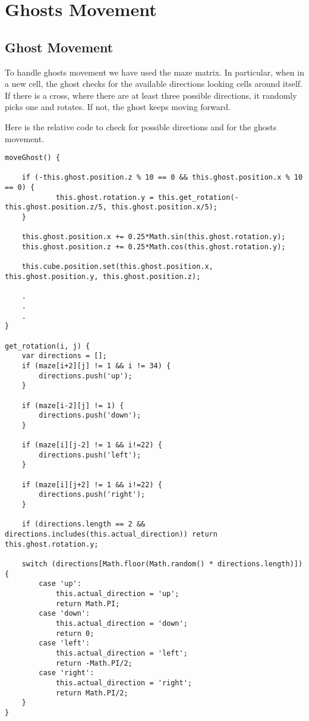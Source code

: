 \documentclass[a4paper,oneside]{report}
\begin{document}
\section{Ghosts Movement}
\subsection{Ghost Movement}
To handle ghosts movement we have used the maze matrix. In particular, when in a new cell, the ghost checks for the available directions looking cells around itself. If there is a cross, where there are at least three possible directions, it randomly picks one and rotates. If not, the ghost keeps moving forward. 

Here is the relative code to check for possible directions and for the ghosts movement.
\begin{lstlisting}
moveGhost() {

    if (-this.ghost.position.z % 10 == 0 && this.ghost.position.x % 10 == 0) {
            this.ghost.rotation.y = this.get_rotation(-this.ghost.position.z/5, this.ghost.position.x/5);
    }

    this.ghost.position.x += 0.25*Math.sin(this.ghost.rotation.y);
    this.ghost.position.z += 0.25*Math.cos(this.ghost.rotation.y);

    this.cube.position.set(this.ghost.position.x, this.ghost.position.y, this.ghost.position.z);
        
    .
    .
    .
}

get_rotation(i, j) {
    var directions = [];
    if (maze[i+2][j] != 1 && i != 34) {
        directions.push('up');
    }

    if (maze[i-2][j] != 1) {
        directions.push('down');
    }

    if (maze[i][j-2] != 1 && i!=22) {
        directions.push('left');
    }
    
    if (maze[i][j+2] != 1 && i!=22) {
        directions.push('right');
    }

    if (directions.length == 2 && directions.includes(this.actual_direction)) return this.ghost.rotation.y;
        
    switch (directions[Math.floor(Math.random() * directions.length)]) {
        case 'up':
            this.actual_direction = 'up';
            return Math.PI;
        case 'down':
            this.actual_direction = 'down';
            return 0;
        case 'left': 
            this.actual_direction = 'left';
            return -Math.PI/2;
        case 'right':
            this.actual_direction = 'right';
            return Math.PI/2;
    }
}


\end{lstlisting}
\end{document}
